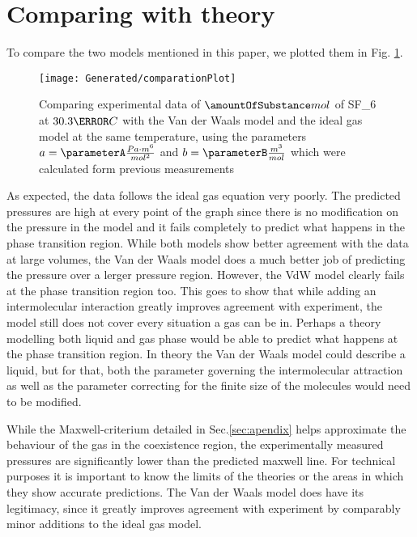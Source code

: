 \documentclass[a4paper,10pt,twocolumn]{article}
\begin{document}
    \section{Comparing with theory}\label{sec:comaringTheory}
    To compare the two models mentioned in this paper, we plotted them in Fig.  \ref{fig:comparingTheories}.
    \begin{figure}
        \begin{center}
            \texttt{[image: Generated/comparationPlot]}
            \caption[]{Comparing experimental data of $\amountOfSubstance mol$ of SF_6\) at $30.3\degree C$ with the Van der Waals model and the ideal gas model at the same temperature, using the parameters $a=\parameterA \frac{Pa\cdot m^6}{mol^2}$ and $b=\parameterB \frac{m^3}{mol}$ which
            were calculated form previous measurements}
            \label{fig:comparingTheories}
        \end{center}
    \end{figure}
    As expected, the data follows the ideal gas equation very poorly.
    The predicted pressures are high at every point of the graph since there is no modification on the pressure in the model and it fails completely to predict what happens in the phase transition region.
    While both models show better agreement with the data at large volumes, the Van der Waals model does a much better job of predicting the pressure over a lerger pressure region.
    However, the VdW model clearly fails at the phase transition region too.
    This goes to show that while adding an intermolecular interaction greatly improves agreement with experiment, the model still does not cover every situation a gas can be in.
    Perhaps a theory modelling both liquid and gas phase would be able to predict what happens at the phase transition region.
    In theory the Van der Waals model could describe a liquid, but for that, both the parameter governing the intermolecular attraction as well as the parameter correcting for the finite size of the molecules would need to be modified.

    While the Maxwell-criterium detailed in Sec.\ref{sec:apendix} helps approximate the behaviour of the gas in the coexistence region, the experimentally measured pressures are significantly lower than the predicted maxwell line.
    For technical purposes it is important to know the limits of the theories or the areas in which they show accurate predictions.
    The Van der Waals model does have its legitimacy, since it greatly improves agreement with experiment by comparably minor additions to the ideal gas model.
\end{document}
